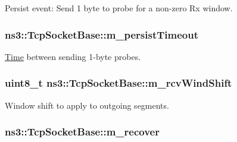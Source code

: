 Persist event\+: Send 1 byte to probe for a non-\/zero Rx window. 

\subsubsection[{\texorpdfstring{m\+\_\+persist\+Timeout}{m_persistTimeout}}]{ ns3\+::\+Tcp\+Socket\+Base\+::m\+\_\+persist\+Timeout\hspace{0.3cm}{\ttfamily [protected]}}\hypertarget{classns3_1_1TcpSocketBase_a036e720fee99f359c288110f90180a62}{}\label{classns3_1_1TcpSocketBase_a036e720fee99f359c288110f90180a62}


\hyperlink{classns3_1_1Time}{Time} between sending 1-\/byte probes. 

\subsubsection[{\texorpdfstring{m\+\_\+rcv\+Wind\+Shift}{m_rcvWindShift}}]{\setlength{\rightskip}{0pt plus 5cm}uint8\+\_\+t ns3\+::\+Tcp\+Socket\+Base\+::m\+\_\+rcv\+Wind\+Shift\hspace{0.3cm}{\ttfamily [protected]}}\hypertarget{classns3_1_1TcpSocketBase_a045fc4c0c16f906c5ec43d853cdb599f}{}\label{classns3_1_1TcpSocketBase_a045fc4c0c16f906c5ec43d853cdb599f}


Window shift to apply to outgoing segments. 

\subsubsection[{\texorpdfstring{m\+\_\+recover}{m_recover}}]{ ns3\+::\+Tcp\+Socket\+Base\+::m\+\_\+recover\hspace{0.3cm}{\ttfamily [protected]}}\hypertarget{classns3_1_1TcpSocketBase_a176f84edf4bba543e7e3457881f6660f}{}\label{classns3_1_1TcpSocketBase_a176f84edf4bba543e7e3457881f6660f}


